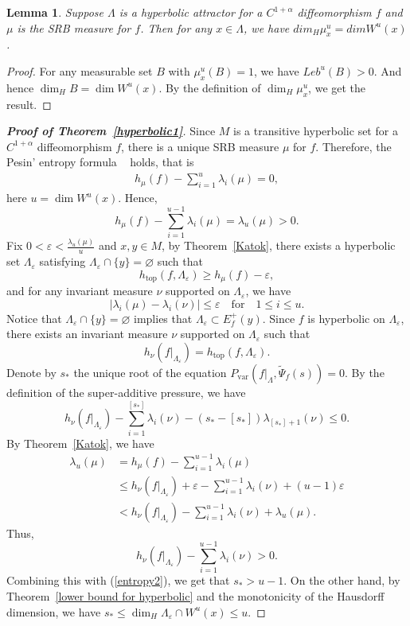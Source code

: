 \documentclass[11pt,a4paper]{amsart}
\theoremstyle{plain}
\newtheorem{Lem}[Thm]{Lemma}
\theoremstyle{remark}
\begin{document}
	\iffalse
	\begin{Lem}
		Suppose $\Lambda$ is a hyperbolic attractor for a $C^{1+\alpha}$ diffeomorphism $f$ and $\mu$ is the SRB measure for $f$. Then for any $x\in \Lambda$, we have $dim_{H}\mu_{x}^{u}=dim W^{u}(x)$.
	\end{Lem}
	\begin{proof}
		For any measurable set $B$ with $\mu_{x}^{u}(B)=1$, we have $Leb^{u}(B)>0$. And hence $\dim_{H} B=\dim W^{u}(x)$. By the definition of $\dim_{H}\mu_{x}^{u}$, we get the result.
	\end{proof}
	
	
	\begin{proof}[\textbf{Proof of Theorem~\ref{hyperbolic1}}]
		Since $M$ is a transitive hyperbolic set for a $C^{1+\alpha}$ diffeomorphism $f$, there is a unique SRB measure $\mu$ for $f$. Therefore, the Pesin' entropy formula ~\cite{LS} holds, that is
		\begin{align*}
			h_{\mu}(f)-\sum^{u}_{i=1} \lambda_{i}(\mu)=0,
		\end{align*}
		here $u=\dim W^{u}(x)$.
		Hence, $$h_{\mu}(f)-\sum^{u-1}_{i=1} \lambda_{i}(\mu)=\lambda_{u}(\mu)>0.$$
		Fix $0<\varepsilon<\frac{\lambda_{u}(\mu)}{u}$ and $x,y\in M$, by Theorem~\ref{Katok}, there exists a hyperbolic set $\Lambda_{\varepsilon}$ satisfying $\Lambda_{\varepsilon}\cap \{y\}=\varnothing$ such that
		$$h_{\text{top}}(f,\Lambda_{\varepsilon})\geq h_{\mu}(f)-\varepsilon,$$
		and for any invariant measure $\nu$ supported on $\Lambda_{\varepsilon}$, we have $$|\lambda_{i}(\mu)-\lambda_{i}(\nu)|\leq \varepsilon\quad \text{for} \quad 1\leq i\leq u.$$ Notice that $\Lambda_{\varepsilon}\cap \{y\}=\varnothing$ implies that $\Lambda_{\varepsilon}\subset E^{+}_{f}(y)$. Since $f$ is hyperbolic on $\Lambda_{\varepsilon}$, there exists an invariant measure $\nu$ supported on $\Lambda_{\varepsilon}$ such that $$h_{\nu}(f|_{\Lambda_{\varepsilon}})=h_{\text{top}}(f,\Lambda_{\varepsilon}).$$ Denote by $s_{\ast}$ the unique root of the equation $P_{\text{var}}(f|_{\Lambda},\tilde{\Psi}_{f}(s))=0$. By the definition of the super-additive pressure, we have
		\begin{equation}\label{entropy2}
			h_{\nu}(f|_{\Lambda_{\varepsilon}})-\sum_{i=1}^{[s_{\ast}]}\lambda_{i}(\nu)-(s_{\ast}-[s_{\ast}])\lambda_{[s_{\ast}]+1}(\nu)\leq 0.
		\end{equation}
		By Theorem~\ref{Katok}, we have
		\begin{align*}
			\lambda_{u}(\mu)&=h_{\mu}(f)-\sum^{u-1}_{i=1} \lambda_{i}(\mu)\\
			&\leq h_{\nu}(f|_{\Lambda_{\varepsilon}})+\varepsilon-\sum_{i=1}^{u-1}\lambda_{i}(\nu)+(u-1)\varepsilon\\
			&<h_{\nu}(f|_{\Lambda_{\varepsilon}})-\sum_{i=1}^{u-1}\lambda_{i}(\nu)+\lambda_{u}(\mu).
		\end{align*}
		Thus, $$h_{\nu}(f|_{\Lambda_{\varepsilon}})-\sum_{i=1}^{u-1}\lambda_{i}(\nu)>0.$$ Combining this with (\ref{entropy2}), we get that $s_{\ast}> u-1$. On the other hand, by Theorem~\ref{lower bound for hyperbolic} and the monotonicity of the Hausdorff dimension, we have $s_{\ast}\leq \dim_{H}\Lambda_{\varepsilon}\cap W^{u}(x)\leq u$.
		

\end{proof}
\end{document}
